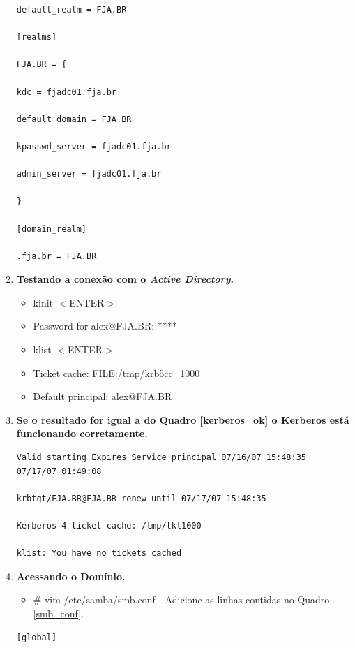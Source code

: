 \begin{enumerate}
\begin{lstlisting}[caption=Valores que devem ser adicionados no /etc/krb5.conf,label={krb5}]
default_realm = FJA.BR

[realms]

FJA.BR = {

kdc = fjadc01.fja.br

default_domain = FJA.BR

kpasswd_server = fjadc01.fja.br

admin_server = fjadc01.fja.br

}

[domain_realm]

.fja.br = FJA.BR
\end{lstlisting}

	\item \textbf {Testando a conexão com o \textit{Active Directory}.}
		\begin{itemize}
			\item {kinit $<$ENTER$>$}
			\item {Password for alex$@$FJA.BR: ****}
			\item {klist $<$ENTER$>$}
			\item {Ticket cache: FILE:/tmp/krb5cc\_1000}
			\item {Default principal: alex$@$FJA.BR}
		\end{itemize}

	\item \textbf {Se o resultado for igual a do Quadro \ref{kerberos_ok} o Kerberos está funcionando corretamente.}\\

		\begin{lstlisting}[caption=Resultado se o Kerberos esta funcionando perfeitamente.,label={kerberos_ok}]
Valid starting Expires Service principal 07/16/07 15:48:35  
07/17/07 01:49:08  

krbtgt/FJA.BR@FJA.BR renew until 07/17/07 15:48:35
	
Kerberos 4 ticket cache: /tmp/tkt1000
	
klist: You have no tickets cached
\end{lstlisting}

	\item \textbf{Acessando o Domínio.}
		\begin{itemize}
			\item {\# vim /etc/samba/smb.conf} -  Adicione as linhas contidas no Quadro \ref{smb_conf}.\\
		\end{itemize}

		\begin{lstlisting}[caption=Arquivo smb.conf para fazer \textit{login} em um domínio.,label={smb_conf}]
[global]


\end{lstlisting}
\end{enumerate}
